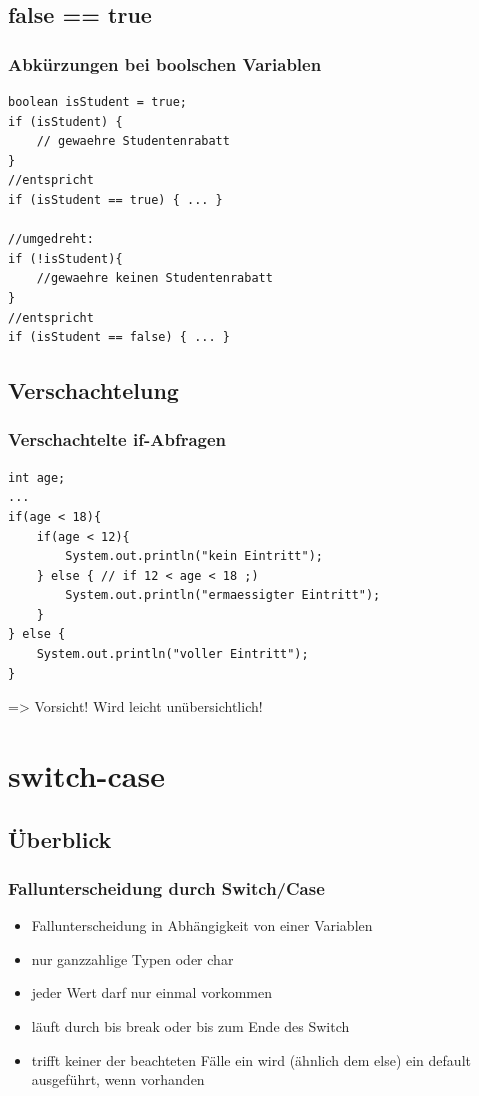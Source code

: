 \documentclass[final]{beamer}
\begin{document}
\subsection{false == true}
\begin{frame}[containsverbatim]
	\frametitle{Abkürzungen bei boolschen Variablen}
	\begin{lstlisting}
boolean isStudent = true;
if (isStudent) {
	// gewaehre Studentenrabatt
}
//entspricht
if (isStudent == true) { ... }

//umgedreht:
if (!isStudent){
	//gewaehre keinen Studentenrabatt
}
//entspricht
if (isStudent == false) { ... }
	\end{lstlisting}
\end{frame}

\subsection{Verschachtelung}
\begin{frame}[containsverbatim]
	\frametitle{Verschachtelte if-Abfragen}
	\begin{lstlisting}
int age;
...
if(age < 18){
	if(age < 12){
		System.out.println("kein Eintritt");
	} else { // if 12 < age < 18 ;)
		System.out.println("ermaessigter Eintritt");
	}
} else {
	System.out.println("voller Eintritt");
}
	\end{lstlisting}
	=> Vorsicht! Wird leicht unübersichtlich!
\end{frame}

\section{switch-case}
\subsection{Überblick}
\begin{frame}[containsverbatim]
	\frametitle{Fallunterscheidung durch Switch/Case}
	\begin{itemize}
		\item{Fallunterscheidung in Abhängigkeit von einer Variablen}
		\item{nur ganzzahlige Typen oder char}
		\item{jeder Wert darf nur einmal vorkommen}
		\item{läuft durch bis break oder bis zum Ende des Switch}
		\item{trifft keiner der beachteten Fälle ein wird (ähnlich dem else) ein default ausgeführt, wenn vorhanden}
	\end{itemize}
\end{frame}
\end{document}
